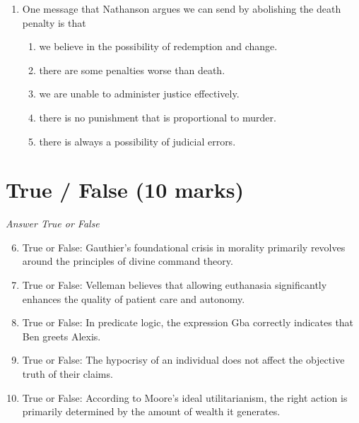\documentclass[12pt]{article}
\begin{document}
\begin{enumerate}[label=\arabic*.]
\begin{enumerate}[label=(\alph*)]
    \item the false dilemma fallacy.
    \item the appeal to authority fallacy.
    \item the straw man fallacy.
    \item the naturalistic fallacy.
    \item the ad hominem fallacy.
\end{enumerate}
\item One message that Nathanson argues we can send by abolishing the death penalty is that
\begin{enumerate}[label=(\alph*)]
    \item we believe in the possibility of redemption and change.
    \item there are some penalties worse than death.
    \item we are unable to administer justice effectively.
    \item there is no punishment that is proportional to murder.
    \item there is always a possibility of judicial errors.
\end{enumerate}
\end{enumerate}

\section*{True / False (10 marks)}
\textit{Answer True or False}
\begin{enumerate}[label=\arabic*.]
\setcounter{enumi}{5}
\item True or False: Gauthier's foundational crisis in morality primarily revolves around the principles of divine command theory.
\item True or False: Velleman believes that allowing euthanasia significantly enhances the quality of patient care and autonomy.
\item True or False: In predicate logic, the expression Gba correctly indicates that Ben greets Alexis.
\item True or False: The hypocrisy of an individual does not affect the objective truth of their claims.
\item True or False: According to Moore's ideal utilitarianism, the right action is primarily determined by the amount of wealth it generates.
\end{enumerate}
\end{document}

